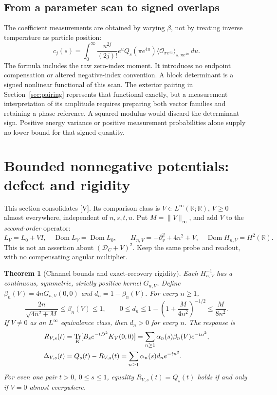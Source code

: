 \documentclass[11pt,letterpaper]{article}
\numberwithin{equation}{section}
\newtheorem{theorem}{Theorem}[section]
\theoremstyle{remark}
\DeclareMathOperator{\Tr}{Tr}
\DeclareMathOperator{\Dom}{Dom}
\newcommand{\R}{\mathbb R}
\newcommand{\dd}{\,d}
\newcommand{\evid}[1]{\textsf{[#1]}}
\newcommand{\dc}{\mathcal D_C}
\begin{document}
\subsection{From a parameter scan to signed overlaps}

The coefficient measurements are obtained by varying \(\beta\),
not by treating inverse temperature as particle position:
\begin{equation}
 c_j(s)=\int_0^\infty\frac{u^{2j}}{(2j)!}
 e^uQ_s(\pi e^{4u})
 \langle\mathcal O_{\pi e^{4u}}\rangle_{s,\pi e^{4u}}\dd u.
 \label{eq:coefficient-scan}
\end{equation}
The formula includes the raw zero-index moment. It introduces no
endpoint compensation or altered negative-index convention.
A block determinant is a signed nonlinear functional of this scan.
The exterior pairing in Section~\ref{sec:pairing} represents that
functional exactly, but a measurement interpretation of its amplitude
requires preparing both vector families and retaining a phase reference.
A squared modulus would discard the determinant sign. Positive energy
variance or positive measurement probabilities alone supply no lower
bound for that signed quantity.

\section{Bounded nonnegative potentials: defect and rigidity}
\label{sec:potential}

This section consolidates \evid{V}. Its comparison class is
\(V\in L^\infty(\R;\R)\), \(V\ge0\) almost everywhere, independent
of \(n,s,t,u\). Put \(M=\|V\|_\infty\), and add \(V\) to the
\emph{second-order} operator:
\begin{equation}
 L_V=L_0+VI,\quad \Dom L_V=\Dom L_0,\qquad
 H_{n,V}=-\partial_v^2+4n^2+V,\quad \Dom H_{n,V}=H^2(\R).
 \label{eq:potential-domain}
\end{equation}
This is not an assertion about \((\dc+V)^2\).
Keep the same probe and readout, with no compensating angular multiplier.

\begin{theorem}[Channel bounds and exact-recovery rigidity]\label{thm:rigidity}
Each \(H_{n,V}^{-1}\) has a continuous, symmetric, strictly positive
kernel \(G_{n,V}\). Define
\(\beta_n(V)=4nG_{n,V}(0,0)\) and \(d_n=1-\beta_n(V)\).
For every \(n\ge1\),
\begin{equation}
 \frac{2n}{\sqrt{4n^2+M}}\le\beta_n(V)\le1,\qquad
 0\le d_n\le1-\left(1+\frac{M}{4n^2}\right)^{-1/2}
 \le\frac{M}{8n^2}. \label{eq:deficit}
\end{equation}
If \(V\ne0\) as an \(L^\infty\) equivalence class, then \(d_n>0\)
for every \(n\). The response is
\begin{align}
 R_{V,s}(t)&=\Tr_K[B_s e^{-tD^2}K_V(0,0)]
       =\sum_{n\ge1}\alpha_n(s)\beta_n(V)e^{-tn^2},\notag\\
 \Delta_{V,s}(t)&=Q_s(t)-R_{V,s}(t)
       =\sum_{n\ge1}\alpha_n(s)d_n e^{-tn^2}. \label{eq:defect}
\end{align}
For even one pair \(t>0,\ 0\le s\le1\), equality
\(R_{V,s}(t)=Q_s(t)\) holds if and only if \(V=0\) almost everywhere.
\end{theorem}
\end{document}
